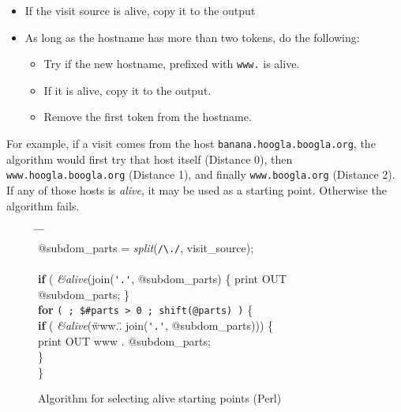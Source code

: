 \documentclass[a4paper]{danarticle}
\theoremstyle{remark}
\begin{document}
       \begin{itemize}
         \item{If the visit source is alive, copy it to the output}
	 \item{As long as the hostname has more than two tokens, do the
	 following:}
	 \begin{itemize}
	   \item{Try if the new hostname, prefixed with \verb$www.$ is alive.}
	   \item{If it is alive, copy it to the output.}
	   \item{Remove the first token from the hostname.}
	 \end{itemize}
       \end{itemize}
       
       For example, if a visit comes from the host
       \verb$banana.hoogla.boogla.org$, the algorithm would first try that
       host itself (Distance 0), then \verb$www.hoogla.boogla.org$ (Distance 1),
       and finally
       \verb$www.boogla.org$ (Distance 2). If any of those hosts is
       \textit{alive}, it may be used as a starting point. Otherwise
       the algorithm fails.
       \begin{figure}[ht]
       {\ttfamily
       \begin{tabbing}
           \hspace{5mm} \= \hspace{5mm} \= \hspace{5mm} \= \hspace{5mm} \= \\
	   @subdom\_parts = \textit{split}(\verb$/\./$, visit\_source); \\
	   \\
	   \textbf{if} ( \textit{\&alive}(join(\verb$'.'$, @subdom\_parts) \{
	   print OUT @subdom\_parts; \} \\
	   \textbf{for} \verb-( ; $#parts > 0 ; shift(@parts) )- \{ \\
	   \>  \textbf{if} ( \textit{\&alive}(\"www.\" . join(\verb$'.'$,
    	   @subdom\_parts))) \{ \\
	   \> \> print OUT www . @subdom\_parts; \\
	   \> \} \\
	   \} \\
         \end{tabbing}}
	 \caption{Algorithm for selecting alive starting points (Perl)}
	 \label{domaintest}
       \end{figure}
\end{document}
